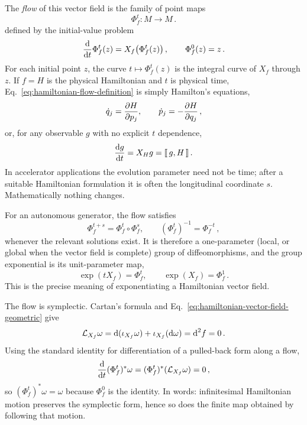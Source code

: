 The \emph{flow} of this vector field is the family of point maps
\begin{equation}
    \Phi_f^t:M\to M\,.
\end{equation}
defined by the initial-value problem
\begin{equation}\label{eq:hamiltonian-flow-definition}
    \frac{\text{d} {}}{\text{d} {t}}\Phi_f^t(z) = X_f\!\left(\Phi_f^t(z)\right),
    \qquad
    \Phi_f^0(z) = z\,.
\end{equation}
For each initial point $z$, the curve $t\mapsto\Phi_f^t(z)$ is the integral
curve of $X_f$ through $z$.  If $f = H$ is the physical Hamiltonian and $t$ is
physical time, Eq.~\eqref{eq:hamiltonian-flow-definition} is simply
Hamilton's equations,
\begin{equation}
    \dot q_j = \frac{\partial {H}}{\partial {p_j}},\qquad
    \dot p_j = -\frac{\partial {H}}{\partial {q_j}}\,,
\end{equation}
or, for any observable $g$ with no explicit $t$ dependence,
\begin{equation}\label{eq:observable-hamilton-equation}
    \frac{\text{d} {g}}{\text{d} {t}} = X_Hg = \llbracket \, g,H\,\rrbracket\,.
\end{equation}
In accelerator applications the evolution parameter need not be time; after
a suitable Hamiltonian formulation it is often the longitudinal coordinate
$s$.  Mathematically nothing changes.

For an autonomous generator, the flow satisfies
\begin{equation}
    \Phi_f^{t + s} = \Phi_f^t\circ\Phi_f^s,
    \qquad
    (\Phi_f^t)^{-1} = \Phi_f^{-t}\,,
\end{equation}
whenever the relevant solutions exist.  It is therefore a one-parameter
(local, or global when the vector field is complete) group of
diffeomorphisms, and the group exponential is its unit-parameter map,
\begin{equation}
    \exp(tX_f) = \Phi_f^t,\qquad \exp(X_f) = \Phi_f^1\,.
\end{equation}
This is the precise meaning of exponentiating a Hamiltonian vector field.

The flow is symplectic.  Cartan's formula and
Eq.~\eqref{eq:hamiltonian-vector-field-geometric} give
\begin{equation}
    \mathcal L_{X_f}\omega = \text{d}(\iota_{X_f}\omega) + \iota_{X_f}(\text{d}\omega)
                           = \text{d}^2f = 0\,.
\end{equation}
Using the standard identity for differentiation of a pulled-back form along
a flow,
\begin{equation}
    \frac{\text{d} {}}{\text{d} {t}}(\Phi_f^t)^*\omega = (\Phi_f^t)^*(\mathcal L_{X_f}\omega) = 0\,,
\end{equation}
so $(\Phi_f^t)^*\omega = \omega$ because $\Phi_f^0$ is the identity.  In
words: infinitesimal Hamiltonian motion preserves the symplectic form, hence
so does the finite map obtained by following that motion.

